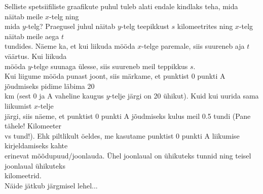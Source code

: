 \begin{center}
{{{\begin{flushleft}
\begin{center}
    \label{t ja s}    
\end{center}
\vspace{2mm}
\hspace{5mm}
Selliste spetsiifiliste graafikute puhul tuleb alati endale kindlaks teha, mida näitab meile $x$-telg ning\\
\hspace{5mm} mida $y$-telg? Praegusel juhul näitab $y$-telg teepikkust $s$ kilomeetrites ning $x$-telg näitab meile aega $t$\\ \hspace{5mm} tundides. Näeme ka, et kui liikuda mööda $x$-telge paremale, siis suureneb aja $t$ väärtus. Kui liikuda\\ \hspace{5mm} mööda $y$-telge suunaga ülesse, siis suureneb meil teppikkus $s$.\\
\vspace{2mm}
\hspace{5mm}
Kui liigume mööda punast joont, siis märkame, et punktist 0 punkti A jõudmiseks pidime läbima 20\\ \hspace{5mm} km (sest 0 ja A vaheline kaugus $y$-telje järgi on 20 ühikut). Kuid kui uurida sama liikumist $x$-telje\\ \hspace{5mm} järgi, siis näeme, et punktist 0 punkti A jõudmiseks kulus meil 0.5 tundi (Pane tähele! Kilomeeter\\ \hspace{5mm} vs tund!). Ehk piltlikult öeldes, me kasutame punktist 0 punkti A liikumise kirjeldamiseks kahte\\ \hspace{5mm} erinevat mõõdupuud/joonlauda. Ühel joonlaual on ühikuteks tunnid ning teisel joonlaual ühikuteks\\ \hspace{5mm} kilomeetrid.\\
\vspace{2mm}
\hspace{5mm} Näide jätkub järgmisel lehel...

\end{flushleft} }}}
\end{center}



\newpage


